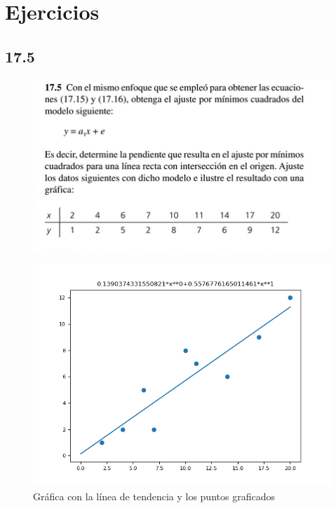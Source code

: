 \documentclass[12pt,oneside,FLEQN]{report}
\begin{document}
{	\section{Ejercicios}
		\subsection{17.5}
			\begin{figure}[!h]
				\centering
				\includegraphics[scale=0.5]{175e.png}
				\caption{}
			\end{figure}
			\begin{figure}[!h]
				\centering
				\includegraphics[scale=0.3]{175.png}
				\caption{Gráfica con la línea de tendencia y los puntos graficados}
			\end{figure}
}
\end{document}
